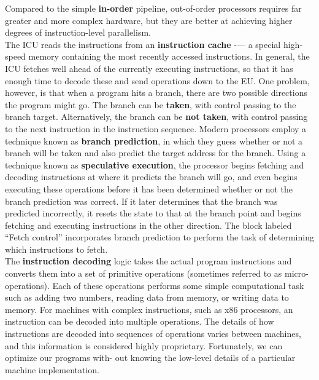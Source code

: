 \documentclass[11pt]{article}
\begin{document}
Compared to the simple \textbf{in-order} pipeline, out-of-order processors requires far greater and more complex hardware, but they are better at achieving higher degrees of instruction-level parallelism.\\

The ICU reads the instructions from an \textbf{instruction cache} -— a special high-speed memory containing the most recently accessed instructions. In general, the ICU fetches well ahead of the currently executing instructions, so that it has enough time to decode these and send operations down to the EU. One problem, however, is that when a program hits a branch, there are two possible directions the program might go. The branch can be \textbf{taken}, with control passing to the branch target. Alternatively, the branch can be \textbf{not taken}, with control passing to the next instruction in the instruction sequence. Modern processors employ a technique known as \textbf{branch prediction}, in which they guess whether or not a branch will be taken and also predict the target address for the branch. Using a technique known as \textbf{speculative execution}, the processor begins fetching and decoding instructions at where it predicts the branch will go, and even begins executing these operations before it has been determined whether or not the branch prediction was correct. If it later determines that the branch was predicted incorrectly, it resets the state to that at the branch point and begins fetching and executing instructions in the other direction. The block labeled “Fetch control” incorporates branch prediction to perform the task of determining which instructions to fetch.\\


The \textbf{instruction decoding} logic takes the actual program instructions and converts them into a set of primitive operations (sometimes referred to as micro-operations). Each of these operations performs some simple computational task such as adding two numbers, reading data from memory, or writing data to memory. For machines with complex instructions, such as x86 processors, an instruction can be decoded into multiple operations. The details of how instructions are decoded into sequences of operations varies between machines, and this information is considered highly proprietary. Fortunately, we can optimize our programs with- out knowing the low-level details of a particular machine implementation.\\
\end{document}
